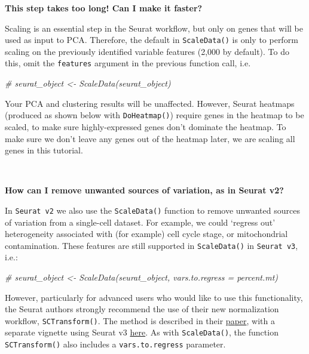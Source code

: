 \documentclass[
]{book}
\newenvironment{Shaded}{\begin{snugshade}}{\end{snugshade}}
\newcommand{\CommentTok}[1]{\textcolor[rgb]{0.56,0.35,0.01}{\textit{#1}}}
\begin{document}
\textbf{This step takes too long! Can I make it faster?}

Scaling is an essential step in the Seurat workflow, but only on genes that will be used as input to PCA. Therefore, the default in \texttt{ScaleData()} is only to perform scaling on the previously identified variable features (2,000 by default). To do this, omit the \texttt{features} argument in the previous function call, i.e.

\begin{Shaded}
\begin{Highlighting}[]
\CommentTok{\# seurat\_object \textless{}{-} ScaleData(seurat\_object)}
\end{Highlighting}
\end{Shaded}

Your PCA and clustering results will be unaffected. However, Seurat heatmaps (produced as shown below with \texttt{DoHeatmap()}) require genes in the heatmap to be scaled, to make sure highly-expressed genes don't dominate the heatmap. To make sure we don't leave any genes out of the heatmap later, we are scaling all genes in this tutorial.

~

\textbf{How can I remove unwanted sources of variation, as in Seurat v2?}

In \texttt{Seurat\ v2} we also use the \texttt{ScaleData()} function to remove unwanted sources of variation from a single-cell dataset. For example, we could `regress out' heterogeneity associated with (for example) cell cycle stage, or mitochondrial contamination. These features are still supported in \texttt{ScaleData()} in \texttt{Seurat\ v3}, i.e.:

\begin{Shaded}
\begin{Highlighting}[]
\CommentTok{\# seurat\_object \textless{}{-} ScaleData(seurat\_object, vars.to.regress = \textquotesingle{}percent.mt\textquotesingle{})}
\end{Highlighting}
\end{Shaded}

However, particularly for advanced users who would like to use this functionality, the Seurat authors strongly recommend the use of their new normalization workflow, \texttt{SCTransform()}. The method is described in their \href{https://genomebiology.biomedcentral.com/articles/10.1186/s13059-019-1874-1}{paper}, with a separate vignette using Seurat v3 \href{sctransform_vignette.html}{here}. As with \texttt{ScaleData()}, the function \texttt{SCTransform()} also includes a \texttt{vars.to.regress} parameter.
\end{document}
